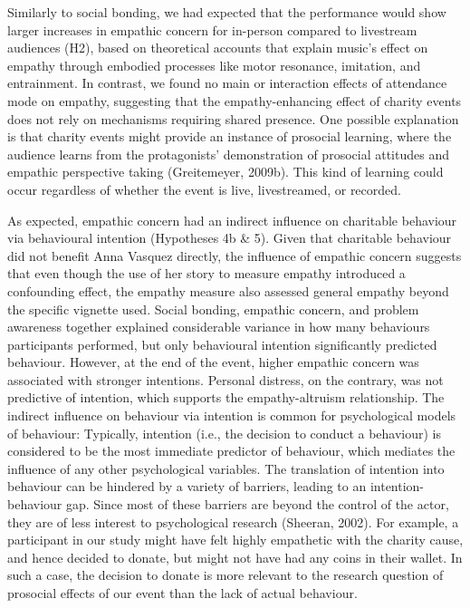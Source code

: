\documentclass[
  man,floatsintext]{apa6}
\begin{document}
Similarly to social bonding, we had expected that the performance would show larger increases in empathic concern for in-person compared to livestream audiences (H2), based on theoretical accounts that explain music's effect on empathy through embodied processes like motor resonance, imitation, and entrainment. In contrast, we found no main or interaction effects of attendance mode on empathy, suggesting that the empathy-enhancing effect of charity events does not rely on mechanisms requiring shared presence. One possible explanation is that charity events might provide an instance of prosocial learning, where the audience learns from the protagonists' demonstration of prosocial attitudes and empathic perspective taking (Greitemeyer, 2009b). This kind of learning could occur regardless of whether the event is live, livestreamed, or recorded.

As expected, empathic concern had an indirect influence on charitable behaviour via behavioural intention (Hypotheses 4b \& 5). Given that charitable behaviour did not benefit Anna Vasquez directly, the influence of empathic concern suggests that even though the use of her story to measure empathy introduced a confounding effect, the empathy measure also assessed general empathy beyond the specific vignette used. Social bonding, empathic concern, and problem awareness together explained considerable variance in how many behaviours participants performed, but only behavioural intention significantly predicted behaviour. However, at the end of the event, higher empathic concern was associated with stronger intentions. Personal distress, on the contrary, was not predictive of intention, which supports the empathy-altruism relationship. The indirect influence on behaviour via intention is common for psychological models of behaviour: Typically, intention (i.e., the decision to conduct a behaviour) is considered to be the most immediate predictor of behaviour, which mediates the influence of any other psychological variables. The translation of intention into behaviour can be hindered by a variety of barriers, leading to an intention-behaviour gap. Since most of these barriers are beyond the control of the actor, they are of less interest to psychological research (Sheeran, 2002). For example, a participant in our study might have felt highly empathetic with the charity cause, and hence decided to donate, but might not have had any coins in their wallet. In such a case, the decision to donate is more relevant to the research question of prosocial effects of our event than the lack of actual behaviour.
\end{document}
